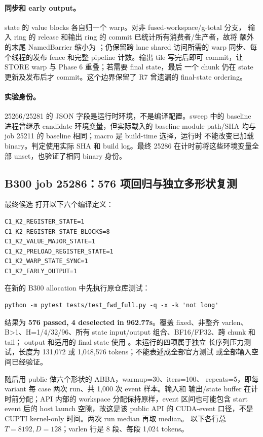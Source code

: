 \paragraph{同步和 early output。}
state 的 value blocks 各自归一个 warp。对非 fused-workspace/g-total 分支，
输入 ring 的 release 和输出 ring 的 commit 已统计所有消费者/生产者，故将
额外的末尾 NamedBarrier 缩小为 ；仍保留跨 lane shared
访问所需的 warp 同步、每个线程的发布 fence 和完整 pipeline 计数。输出 tile
写完后即可 commit，让 STORE warp 与 Phase 6 重叠；若需要 final state，最后
一个 chunk 仍在 state 更新及发布后才 commit。这个边界保留了 R7 曾遗漏的
final-state ordering。

\paragraph{实验身份。}
25266/25281 的  JSON 字段是运行时环境，不是编译配置。sweep
中的 baseline 进程曾继承 candidate 环境变量，但实际载入的 baseline module
path/SHA 均与 job 25211 的 baseline 相同；macro 是 build-time 选择，运行时
不能改变已加载 binary。判定使用实际  SHA 和 build log。最终
25286 在计时前将这些环境变量全部 unset，也验证了相同 binary 身份。

\subsection{B300 job 25286：576 项回归与独立多形状复测}

最终候选  打开以下六个编译定义：
\begin{lstlisting}
C1_K2_REGISTER_STATE=1
C1_K2_REGISTER_STATE_BLOCKS=8
C1_K2_VALUE_MAJOR_STATE=1
C1_K2_PRELOAD_REGISTER_STATE=1
C1_K2_WARP_STATE_SYNC=1
C1_K2_EARLY_OUTPUT=1
\end{lstlisting}

在新的 B300 allocation 中先执行原仓库测试：
\begin{lstlisting}
python -m pytest tests/test_fwd_full.py -q -x -k 'not long'
\end{lstlisting}
结果为 \textbf{576 passed, 4 deselected in 962.77s}。覆盖 fixed、非整齐 varlen、
B>1、H=1/4/32/96、所有 state input/output 组合、BF16/FP32、跨 chunk 和 tail；
output 和适用的 final state 使用 。未运行的四项属于独立
长序列压力测试，长度为 131,072 或 1,048,576 tokens；不能表述成全部官方测试
或全部输入空间已经验证。

随后用 public  做六个形状的 ABBA，warmup=30、iters=100、
repeats=5，即每 variant 每 case 两次 run、共 1,000 次 event 样本。输入和
输出/state buffer 在计时前分配；API 内部的 workspace 分配保持原样，event
区间也可能包含 start event 后的 host launch 空隙，故这是该 public API 的
CUDA-event 口径，不是 CUPTI kernel-only 时间。两次 run median 再取 median。
以下各行总 \(T=8192,D=128\)；varlen 行是 8 段、每段 1,024 tokens。

